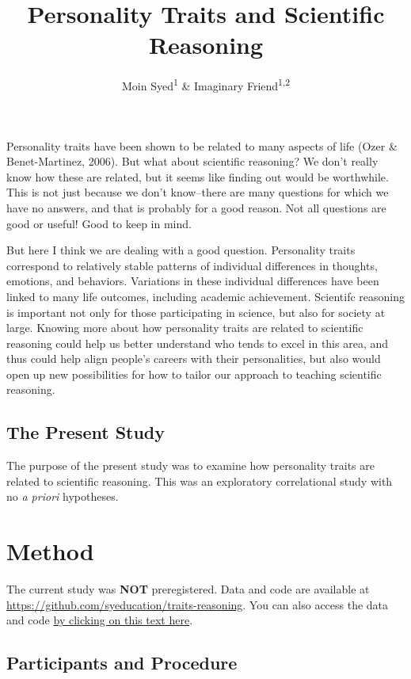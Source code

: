 \documentclass[
  english,
  man,floatsintext]{apa6}
\title{Personality Traits and Scientific Reasoning}
\author{Moin Syed\textsuperscript{1} \& Imaginary Friend\textsuperscript{1,2}}
\date{}
\affiliation{\vspace{0.5cm}\textsuperscript{1} University of Minnesota\\\textsuperscript{2} University of Darache}
\begin{document}
\maketitle

Personality traits have been shown to be related to many aspects of life (Ozer \& Benet-Martinez, 2006). But what about scientific reasoning? We don't really know how these are related, but it seems like finding out would be worthwhile. This is not just because we don't know--there are many questions for which we have no answers, and that is probably for a good reason. Not all questions are good or useful! Good to keep in mind.

But here I think we are dealing with a good question. Personality traits correspond to relatively stable patterns of individual differences in thoughts, emotions, and behaviors. Variations in these individual differences have been linked to many life outcomes, including academic achievement. Scientifc reasoning is important not only for those participating in science, but also for society at large. Knowing more about how personality traits are related to scientific reasoning could help us better understand who tends to excel in this area, and thus could help align people's careers with their personalities, but also would open up new possibilities for how to tailor our approach to teaching scientific reasoning.

\subsection{The Present Study}\label{the-present-study}

The purpose of the present study was to examine how personality traits are related to scientific reasoning. This was an exploratory correlational study with no \emph{a priori} hypotheses.

\section{Method}\label{method}

The current study was \textbf{NOT} preregistered. Data and code are available at \url{https://github.com/syeducation/traits-reasoning}.
You can also access the data and code \href{https://github.com/syeducation/traits-reasoning}{by clicking on this text here}.

\subsection{Participants and Procedure}\label{participants-and-procedure}
\end{document}
